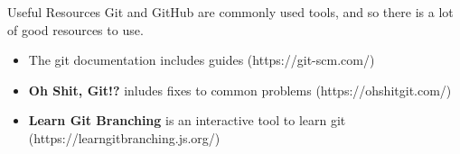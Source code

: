 \documentclass{beamer}
\begin{document}
\begin{frame}{Useful Resources}
Git and GitHub are commonly used tools, and so there is a lot of good resources to use. \pause 


  \begin{itemize}
    \item <2-> The git documentation includes guides (https://git-scm.com/)
    \item <3-> \textbf{Oh Shit, Git!?} inludes fixes to common problems (https://ohshitgit.com/)
    \item <4-> \textbf{Learn Git Branching} is an interactive tool to learn git (https://learngitbranching.js.org/)
  \end{itemize}
\end{frame}
\end{document}
